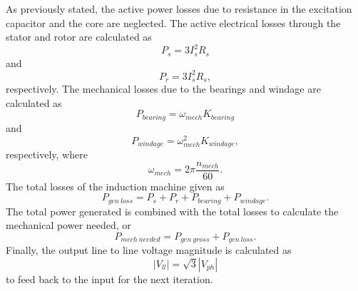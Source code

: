As previously stated, the active power losses due to resistance in the excitation capacitor and the core are neglected. The active electrical losses through the stator and rotor are calculated as 
\begin{equation}
P_s = 3 I_s^2 R_s
\end{equation}
and 
\begin{equation}
P_r = 3 I_s^2 R_s,
\end{equation}
respectively. The mechanical losses due to the bearings and windage are calculated as \cite{pyrhonen2013design} 
\begin{equation}
P_{bearing} = \omega_{mech} K_{bearing}
\end{equation} 
and \cite{Vrancik1968}
\begin{equation}
P_{windage} = \omega_{mech}^2 K_{windage},
\end{equation}
respectively, where 
\begin{equation}
\omega_{mech} = 2 \pi \frac{n_{mech}}{60}.
\end{equation}
The total losses of the induction machine given as 
\begin{equation}
P_{gen\ loss} = P_s + P_r + P_{bearing} + P_{windage}. 
\end{equation}
The total power generated is combined with the total losses to calculate the mechanical power needed, or 
\begin{equation}
P_{mech\ needed} = P_{gen\ gross} + P_{gen\ loss}. 
\end{equation}	
Finally, the output line to line voltage magnitude is calculated as
\begin{equation}
\left|V_{ll}\right| = \sqrt{3}\left|V_{ph}\right|
\end{equation} 
to feed back to the input for the next iteration.

